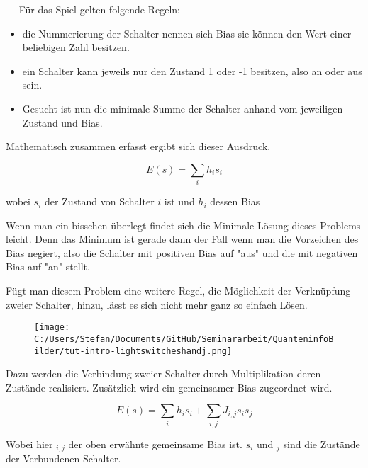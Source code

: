 \documentclass{article}
\begin{document}
\
\
\flushleft
Für das Spiel gelten folgende Regeln:


\begin{itemize}


\item die Nummerierung der Schalter nennen sich Bias sie können den Wert einer beliebigen Zahl besitzen.

\item ein Schalter kann jeweils nur den Zustand 1 oder -1 besitzen, also an oder aus sein.

\item Gesucht ist nun die minimale Summe der Schalter anhand vom jeweiligen Zustand und Bias.


\end{itemize}


Mathematisch zusammen erfasst ergibt sich dieser Ausdruck.

\begin{equation}
E(s) = \sum_{i} h_{i}s_{i}
\label{schalterspiel1}
\end{equation}

wobei $s_{i}$ der Zustand von Schalter $i$ ist 
und $h_{i}$ dessen Bias

Wenn man ein bisschen überlegt findet sich die Minimale Lösung dieses Problems leicht. Denn das Minimum ist gerade dann der Fall wenn man 
die Vorzeichen des Bias negiert, also die Schalter mit positiven Bias auf "aus" und die mit negativen Bias auf "an" stellt.

\newpage

Fügt man diesem Problem eine weitere Regel, die Möglichkeit der Verknüpfung zweier Schalter, hinzu, lässt es sich nicht mehr ganz so einfach Lösen.


\begin{figure}[H]
		\centering
\texttt{[image: C:/Users/Stefan/Documents/GitHub/Seminararbeit/QuanteninfoBilder/tut-intro-lightswitcheshandj.png]}


\end{figure}


Dazu werden die Verbindung zweier Schalter durch Multiplikation deren
Zustände realisiert. Zusätzlich wird ein gemeinsamer Bias zugeordnet wird.

\begin{equation}
E(s) = \sum_{i} h_{i}s_{i} + \sum_{i,j} J_{i,j} s_{i} s_{j}
\label{schalterspiel2}
\end{equation}


Wobei hier $_{i,j}$ der oben erwähnte gemeinsame Bias ist.
$s_{i}$ und $_{j}$ sind die Zustände der Verbundenen Schalter.
\newline
\end{document}
